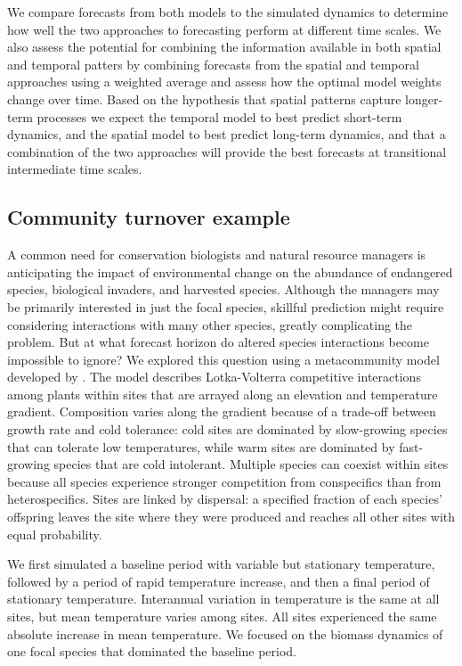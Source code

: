 \documentclass[11pt]{article}
\begin{document}
We compare forecasts from both models to the simulated dynamics to determine how well the two approaches to forecasting perform at different time scales. We also assess the potential for combining the information available in both spatial and temporal patters by combining forecasts from the spatial and temporal approaches using a weighted average and assess how the optimal model weights change over time. Based on the hypothesis that spatial patterns capture longer-term processes we expect the temporal model to best predict short-term dynamics, and the spatial model to best predict long-term dynamics, and that a combination of the two approaches will provide the best forecasts at transitional intermediate time scales.

\subsection*{Community turnover example}

A common need for conservation biologists and natural resource managers is anticipating the impact of environmental change on the abundance of 
endangered species, biological invaders, and harvested species. Although the managers may be primarily interested in just the focal species, 
skillful prediction might require considering interactions with many other species, greatly complicating the problem. But at what forecast horizon do
altered species interactions become impossible to ignore? We explored this question using a metacommunity model developed by \cite{alexander_lags_2018}. 
The model describes Lotka-Volterra competitive interactions among plants within sites that are arrayed along an elevation and temperature gradient.
Composition varies along the gradient because of a trade-off between growth rate and cold tolerance: 
cold sites are dominated by slow-growing species that can tolerate low temperatures, while warm sites are dominated by 
fast-growing species that are cold intolerant. Multiple species can coexist within sites because all species experience stronger competition from conspecifics than from heterospecifics. 
Sites are linked by dispersal: a specified fraction of each species' offspring leaves the site where they were produced and reaches all other sites with equal probability.

We first simulated a baseline period with variable but stationary temperature, followed by a period of rapid temperature increase, and then a 
final period of stationary temperature. Interannual variation in temperature is the same at all sites, but mean temperature varies among sites. All sites experienced the 
same absolute increase in mean temperature. We focused on the biomass dynamics of one focal species that dominated the baseline period.
\end{document}
